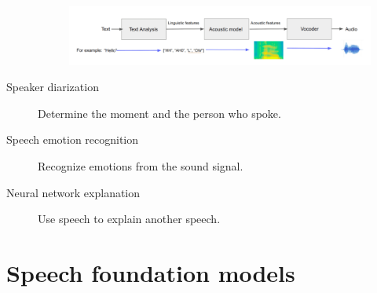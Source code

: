 \begin{description}
\begin{example}
            \begin{figure}[H]
                \centering
                \includegraphics[width=0.9\linewidth]{./img/tts_arch.png}
            \end{figure}
        \end{example}

    \item[Speaker diarization]
        Determine the moment and the person who spoke.

    \item[Speech emotion recognition]
        Recognize emotions from the sound signal.

    \item[Neural network explanation]
        Use speech to explain another speech.
\end{description}



\section{Speech foundation models}


